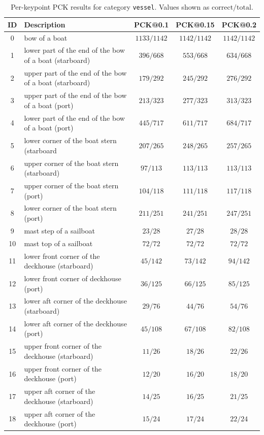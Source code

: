 \begin{table}[h]
\centering
\small
\caption{Per-keypoint PCK results for category \texttt{vessel}. Values shown as $\text{correct}/\text{total}$.}
\label{tab:pck_vessel}
\begin{tabular}{cl ccc}
\toprule
ID & Description & PCK@0.1 & PCK@0.15 & PCK@0.2 \\
\midrule
0 & bow of a boat & $1133/1142$ & $1142/1142$ & $1142/1142$ \\
1 & lower part of the end of the bow of a boat (starboard) & $396/668$ & $553/668$ & $634/668$ \\
2 & upper part of the end of the bow of a boat (starboard) & $179/292$ & $245/292$ & $276/292$ \\
3 & upper part of the end of the bow of a boat (port) & $213/323$ & $277/323$ & $313/323$ \\
4 & lower part of the end of the bow of a boat (port) & $445/717$ & $611/717$ & $684/717$ \\
5 & lower corner of the boat stern (starboard & $207/265$ & $248/265$ & $257/265$ \\
6 & upper corner of the boat stern (starboard) & $97/113$ & $113/113$ & $113/113$ \\
7 & upper corner of the boat stern (port) & $104/118$ & $111/118$ & $117/118$ \\
8 & lower corner of the boat stern (port) & $211/251$ & $241/251$ & $247/251$ \\
9 & mast step of a sailboat & $23/28$ & $27/28$ & $28/28$ \\
10 & mast top of a sailboat & $72/72$ & $72/72$ & $72/72$ \\
11 & lower front corner of the deckhouse (starboard) & $45/142$ & $73/142$ & $94/142$ \\
12 & lower front corner of deckhouse (port) & $36/125$ & $66/125$ & $85/125$ \\
13 & lower aft corner of the deckhouse (starboard) & $29/76$ & $44/76$ & $54/76$ \\
14 & lower aft corner of the deckhouse (port) & $45/108$ & $67/108$ & $82/108$ \\
15 & upper front corner of the deckhouse (starboard) & $11/26$ & $18/26$ & $22/26$ \\
16 & upper front corner of the deckhouse (port) & $12/20$ & $16/20$ & $18/20$ \\
17 & upper aft corner of the deckhouse (starboard) & $14/25$ & $16/25$ & $21/25$ \\
18 & upper aft corner of the deckhouse (port) & $15/24$ & $17/24$ & $22/24$ \\

\end{tabular}
\end{table}
